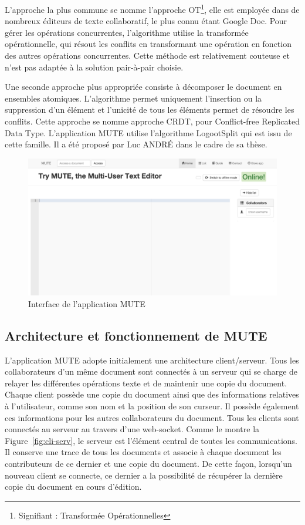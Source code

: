 \documentclass{tnreport}
\begin{document}
L'approche la plus commune se nomme l'approche OT\footnote{Signifiant : Transformée Opérationnelles}, elle est employée dans de nombreux éditeurs de texte collaboratif, le plus connu étant Google Doc. Pour gérer les opérations concurrentes, l'algorithme utilise la transformée opérationnelle, qui résout les conflits en transformant une opération en fonction des autres opérations concurrentes. Cette méthode est relativement couteuse et n'est pas adaptée à la solution pair-à-pair choisie. 

Une seconde approche plus appropriée consiste à décomposer le document en ensembles atomiques. L'algorithme permet uniquement l'insertion ou la suppression d'un élément et l'unicité de tous les éléments permet de résoudre les conflits. Cette approche se nomme approche CRDT, pour Conflict-free Replicated Data Type. L’application MUTE utilise l'algorithme LogootSplit qui est issu de cette famille. Il a été proposé par Luc ANDRÉ dans le cadre de sa thèse.

\begin{figure}[!h]
  \centering
  \includegraphics[width=14cm]{figures/screenshot-mute}
  \caption{Interface de l'application MUTE}
  \label{fig:screen-mute}
\end{figure}


\subsection{Architecture et fonctionnement de MUTE}

L'application MUTE adopte initialement une architecture client/serveur. Tous les collaborateurs d'un même document sont connectés à un serveur qui se charge de relayer les différentes opérations texte et de maintenir une copie du document. Chaque client possède une copie du document ainsi que des informations relatives à l'utilisateur, comme son nom et la position de son curseur. Il possède également ces informations pour les autres collaborateurs du document. Tous les clients sont connectés au serveur au travers d'une web-socket. Comme le montre la Figure~\ref{fig:cli-serv}, le serveur est l'élément central de toutes les communications. Il conserve une trace de tous les documents et associe à chaque document les contributeurs de ce dernier et une copie du document. De cette façon, lorsqu'un nouveau client se connecte, ce dernier a la possibilité de récupérer la dernière copie du document en cours d'édition. 
\end{document}
